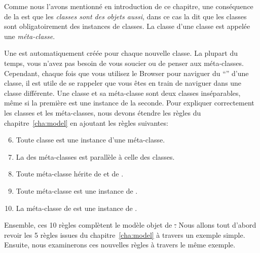 \documentclass[a4paper,10pt,twoside]{book}
\begin{document}
Comme nous l'avons mentionné en introduction de ce chapitre, une conséquence de la  est que les \emph{classes sont des objets aussi}, dans ce cas la  dit que les classes sont obligatoirement des instances de classes.
La classe d'une classe est appelée une \emph{méta-classe}.

Une  est automatiquement créée pour chaque nouvelle classe.
La plupart du temps, vous n'avez pas besoin de vous soucier ou de penser aux méta-classes.
Cependant, chaque fois que vous utilisez le Browser pour naviguer du  ``'' d'une classe, il est utile de se rappeler que vous êtes en train de naviguer dans une classe différente.
Une classe et sa méta-classe sont deux classes inséparables, même si la première est une instance de la seconde.
Pour expliquer correctement les classes et les méta-classes, nous devons étendre les règles du chapitre~\ref{cha:model} en ajoutant les règles suivantes:

\begin{enumerate}[label={\textbf{Règle \arabic{*}}.}, ref={Règle \arabic{*}}, leftmargin=*, widest=10]
\setcounter{enumi}{5}
\item{} 
	Toute classe est une instance d'une méta-classe.

\item{} 
	La  des méta-classes est parallèle à celle des classes.

\item{} 
	Toute méta-classe hérite de  et de .

\item{} 
	Toute méta-classe est une instance de .

\item{} 
	La méta-classe de  est une instance de .

\end{enumerate}

Ensemble, ces 10 règles complètent le modèle objet de \st.
Nous allons tout d'abord revoir les 5 règles issues du chapitre~\ref{cha:model} à travers un exemple simple.
Ensuite, nous examinerons ces nouvelles règles à travers le même exemple.

\end{document}
